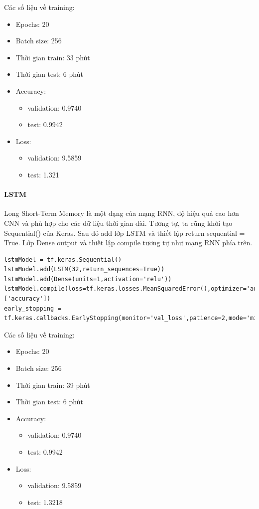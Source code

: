 \documentclass{article}
\begin{document}
Các số liệu về training:
\begin{itemize}
	\item Epochs: 20
	\item Batch size: 256
	\item Thời gian train: 33 phút
	\item Thời gian test: 6 phút
	\item Accuracy:
	      \begin{itemize}
		      \item validation: 0.9740
		      \item test: 0.9942
	      \end{itemize}
	\item Loss:
	      \begin{itemize}
		      \item validation: 9.5859
		      \item test: 1.321
	      \end{itemize}
\end{itemize}

\paragraph{LSTM} Long Short-Term Memory là một dạng của mạng RNN, độ hiệu quả cao hơn CNN và phù hợp cho các dữ liệu thời gian dài. Tương tự, ta cũng khởi tạo Sequential() của Keras. Sau đó add lớp LSTM và thiết lập return sequential = True. Lớp Dense output và thiết lập compile tương tự như mạng RNN phía trên.

\begin{verbatim}
lstmModel = tf.keras.Sequential()
lstmModel.add(LSTM(32,return_sequences=True))
lstmModel.add(Dense(units=1,activation='relu'))
lstmModel.compile(loss=tf.keras.losses.MeanSquaredError(),optimizer='adam',metrics=['accuracy'])
early_stopping = tf.keras.callbacks.EarlyStopping(monitor='val_loss',patience=2,mode='min')
\end{verbatim}

Các số liệu về training:
\begin{itemize}
	\item Epochs: 20
	\item Batch size: 256
	\item Thời gian train: 39 phút
	\item Thời gian test: 6 phút
	\item Accuracy:
	      \begin{itemize}
		      \item validation: 0.9740
		      \item test: 0.9942
	      \end{itemize}
	\item Loss:
	      \begin{itemize}
		      \item validation: 9.5859
		      \item test: 1.3218
	      \end{itemize}
\end{itemize}
\end{document}
